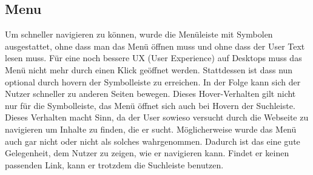 \subsection{Menu}
Um schneller navigieren zu können, wurde die Menüleiste mit Symbolen ausgestattet, ohne dass man das Menü öffnen muss und ohne dass der User Text lesen muss. Für eine noch bessere UX (User Experience) auf Desktops muss das Menü nicht mehr durch einen Klick geöffnet werden. Stattdessen ist dass nun optional durch hovern der Symbolleiste zu erreichen. In der Folge kann sich der Nutzer schneller zu anderen Seiten bewegen. Dieses Hover-Verhalten gilt nicht nur für die Symbolleiste, das Menü öffnet sich auch bei Hovern der Suchleiste. Dieses Verhalten macht Sinn, da der User sowieso versucht durch die Webseite zu navigieren um Inhalte zu finden, die er sucht. 
Möglicherweise wurde das Menü auch gar nicht oder nicht als solches wahrgenommen. Dadurch ist das eine gute Gelegenheit, dem Nutzer zu zeigen, wie er navigieren kann. Findet er keinen passenden Link, kann er trotzdem die Suchleiste benutzen.
